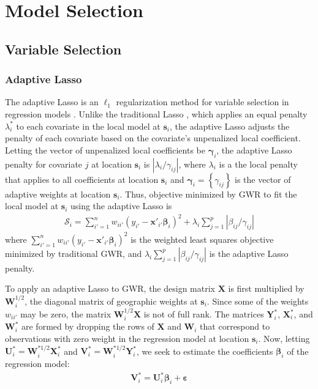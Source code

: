 \documentclass[authoryear, review, 11pt]{elsarticle}
\begin{document}
	
	 
	
\section{Model Selection \label{section:model-selection}}
	\subsection{Variable Selection}	
	
	

	
	\subsubsection{Adaptive Lasso}
	The adaptive Lasso is an $\ell_1$ regularization method for variable selection in regression models \citep{Zou:2006}. Unlike the traditional Lasso \citep{Tibshirani:1996}, which applies an equal penalty $\lambda^*_i$ to each covariate in the local model at $\bm{s}_i$, the adaptive Lasso adjusts the penalty of each covariate based on the covariate's unpenalized local coefficient. Letting the vector of unpenalized local coefficients be $\bm{\gamma}_i$, the adaptive Lasso penalty for covariate $j$ at location $\bm{s}_i$ is $|\lambda_i / \gamma_{ij}|$, where $\lambda_i$ is a the local penalty that applies to all coefficients at location $\bm{s}_i$ and $\bm{\gamma}_i  =\left\{\gamma_{ij}\right\}$ is the vector of adaptive weights at location $\bm{s}_i$. Thus, objective minimized by GWR to fit the local model at $\bm{s}_i$ using the adaptive Lasso is
	\begin{align}\label{eq:adaptive-lasso-WLS}
		\mathcal{S}_i = \sum_{i'=1}^n w_{ii'} \left(y_{i'} - \bm{x}'_{i'} \bm{\beta}_i \right)^2 +  \lambda_i \sum_{j=1}^p |\beta_{ij} / \gamma_{ij}|
	\end{align}
	where $\sum_{i'=1}^n w_{ii'} \left(y_{i'} - \bm{x}'_{i'} \bm{\beta}_i \right)^2$ is the weighted least squares objective minimized by traditional GWR, and $\lambda_i \sum_{j=1}^p |\beta_{ij} / \gamma_{ij}|$ is the adaptive Lasso penalty.
	
	To apply an adaptive Lasso to GWR, the design matrix $\bm{X}$ is first multiplied by $\bm{W}_i^{1/2}$, the diagonal matrix of geographic weights at $\bm{s}_i$. Since some of the weights $w_{ii'}$ may be zero, the matrix $\bm{W}_i^{1/2}\bm{X}$ is not of full rank. The matrices $\bm{Y}_i^*$, $\bm{X}_i^*$, and $\bm{W}_i^*$ are formed by dropping the rows of $\bm{X}$  and $\bm{W}_i$ that correspond to observations with zero weight in the regression model at location $\bm{s}_i$. Now, letting $\bm{U}_i^* = \bm{W}_i^{*1/2} \bm{X}_i^*$ and $\bm{V}_i^* = \bm{W}_i^{*1/2} \bm{Y}_i^*$, we seek to estimate the coefficients $\bm{\beta}_i$ of the regression model:	
	\begin{align}
		\bm{V}_i^* = \bm{U}_i^* \bm{\beta}_i + \bm{\varepsilon}
	\end{align}
	
\end{document}
